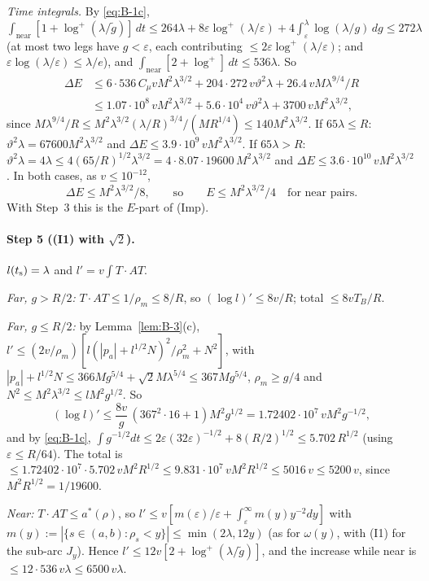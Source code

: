 \emph{Time integrals.} By \eqref{eq:B-1c},
$\int_{\mathrm{near}}[1+\log^+(\lambda/\tilde g)]\,dt\le264\lambda+8\varepsilon\log^+(\lambda/\varepsilon)+4\int_\varepsilon^\lambda
\log(\lambda/g)\,dg\le272\lambda$ (at most two legs have $g<\varepsilon$, each contributing
$\le2\varepsilon\log^+(\lambda/\varepsilon)$; and $\varepsilon\log(\lambda/\varepsilon)\le\lambda/e$), and
$\int_{\mathrm{near}}[2+\log^+]\,dt\le536\lambda$. So
\begin{align*}
\Delta E&\le6\cdot536\,C_\mu vM^2\lambda^{3/2}+204\cdot272\,v\vartheta^2\lambda+26.4\,vM\lambda^{9/4}/R\\
&\le1.07\cdot10^8\,vM^2\lambda^{3/2}+5.6\cdot10^4\,v\vartheta^2\lambda+3700\,vM^2\lambda^{3/2},
\end{align*}
since $M\lambda^{9/4}/R\le M^2\lambda^{3/2}(\lambda/R)^{3/4}/(MR^{1/4})\le140M^2\lambda^{3/2}$. If $65\lambda\le R$:
$\vartheta^2\lambda=67600M^2\lambda^{3/2}$ and $\Delta E\le3.9\cdot10^9\,vM^2\lambda^{3/2}$. If $65\lambda>R$:
$\vartheta^2\lambda=4\lambda\le4(65/R)^{1/2}\lambda^{3/2}=4\cdot8.07\cdot19600\,M^2\lambda^{3/2}$ and
$\Delta E\le3.6\cdot10^{10}\,vM^2\lambda^{3/2}$. In both cases, as $v\le10^{-12}$,
\[
\Delta E\le M^2\lambda^{3/2}/8,\qquad\text{so}\qquad E\le M^2\lambda^{3/2}/4\quad\text{for near pairs.}
\]
With Step~3 this is the $E$-part of (Imp).

\paragraph{Step 5 ((I1) with $\sqrt2$).}
$l(t_{\mathrm s})=\lambda$ and $l'=v\int T\cdot AT$.

\emph{Far, $g>R/2$:} $T\cdot AT\le1/\rho_m\le8/R$, so $(\log l)'\le8v/R$; total $\le8vT_B/R$.

\emph{Far, $g\le R/2$:} by Lemma~\ref{lem:B-3}(c), $l'\le(2v/\rho_m)[l(|p_a|+l^{1/2}N)^2/\rho_m^2+N^2]$, with
$|p_a|+l^{1/2}N\le366Mg^{5/4}+\sqrt2M\lambda^{5/4}\le367Mg^{5/4}$, $\rho_m\ge g/4$ and $N^2\le M^2\lambda^{3/2}\le lM^2g^{1/2}$. So
\[
(\log l)'\le\frac{8v}g\,(367^2\cdot16+1)M^2g^{1/2}=1.72402\cdot10^7\,vM^2g^{-1/2},
\]
and by \eqref{eq:B-1c}, $\int g^{-1/2}dt\le2\varepsilon(32\varepsilon)^{-1/2}+8(R/2)^{1/2}\le5.702\,R^{1/2}$ (using
$\varepsilon\le R/64$). The total is $\le1.72402\cdot10^7\cdot5.702\,vM^2R^{1/2}\le9.831\cdot10^7\,vM^2R^{1/2}\le5016\,v\le5200\,v$,
since $M^2R^{1/2}=1/19600$.

\emph{Near:} $T\cdot AT\le a^*(\rho)$, so $l'\le v[m(\varepsilon)/\varepsilon+\int_\varepsilon^\infty m(y)y^{-2}dy]$ with
$m(y):=|\{s\in(a,b):\rho_s<y\}|\le\min(2\lambda,12y)$ (as for $\omega(y)$, with (I1) for the sub-arc $J_y$). Hence
$l'\le12v[2+\log^+(\lambda/\tilde g)]$, and the increase while near is $\le12\cdot536\,v\lambda\le6500\,v\lambda$.

